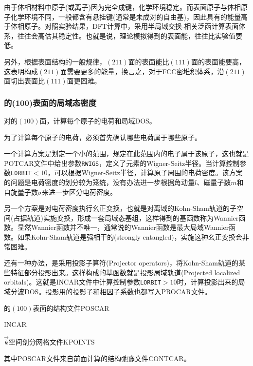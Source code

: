 由于体相材料中原子(或离子)因为完全成键，化学环境稳定。而表面原子与体相原子化学环境不同，一般都含有悬挂键(通常是未成对的自由基)，因此具有的能量高于体相原子。对照实验结果，\textrm{DFT}计算中，采用半局域交换-相关泛函计算表面体系，往往会高估其稳定性。也就是说，理论模拟得到的表面能，往往比实验值要低。

另外，根据表面结构的一般规律，$(211)$面的表面能比$(111)$面的表面能要高，这表明构成$(211)$面需要更多的能量，换言之，对于\textrm{FCC}密堆积体系，沿$(211)$面切出表面比$(111)$面更困难。

\subsubsection{的(100)表面的局域态密度}
对的$(100)$面，计算每个原子的电荷和局域\textrm{DOS}。

为了计算每个原子的电荷，必须首先确认哪些电荷属于哪些原子。%

一个计算方案是划定一个小的范围，规定在此范围内的电子属于该原子，这也就是\textrm{POTCAR}文件中给出参数\texttt{RWIGS}，定义了元素的\textrm{Wigner-Seitz}半径。当计算控制参数\texttt{LORBIT}$<10$，可以根据\textrm{Wigner-Seitz}半径，计算原子周围的电荷密度。该方案的问题是电荷密度的划分较为笼统，没有办法进一步根据角动量$l$、磁量子数$m$和自旋量子数$\sigma$来进一步区分电荷密度。

另一个方案是对电荷密度执行幺正变换，也就是对离域的\textrm{Kohn-Sham}轨道的子空间(占据轨道)实施变换，形成一套局域态基组，这样得到的基函数称为\textrm{Wannier}函数。显然\textrm{Wannier}函数并不唯一，通常说的\textrm{Wannier}函数是最大局域\textrm{Wannier}函数。如果\textrm{Kohn-Sham}轨道是强相干的\textrm{(strongly entangled)}，实施这种幺正变换会非常困难。

还有一种办法，是采用投影子算符\textrm{(Projector operators)}，将\textrm{Kohn-Sham}轨道的某些特征部分投影出来。这样构成的基函数就是投影局域轨道\textrm{(Projected localized orbitals)}\textcolor{red}{}。这就是\textrm{INCAR}文件中计算控制参数\texttt{LORBIT}$>10$时，计算投影出来的局域分波\textrm{DOS}。投影用的投影子和相因子系数也都写入\textrm{PROCAR}文件。

的$(100)$表面的结构文件\textrm{POSCAR}

\textrm{INCAR}

$\vec k$空间剖分网格文件\textrm{KPOINTS}

其中\textrm{POSCAR}文件来自前面计算的结构弛豫文件\textrm{CONTCAR}。

